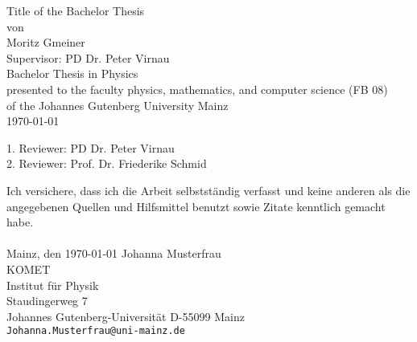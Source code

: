 \documentclass[a4paper,11pt,oneside,final,english,toc=bib]{scrbook}
\begin{document}

\begin{titlepage}
  \vspace*{6mm}
  \begin{center}
     {\afont Title of the Bachelor Thesis}
     \\[3.5cm]
     {\large von}
     \\[3.5cm]
     {\dfont Moritz Gmeiner}
     \\[1.5cm]
     {\dfont Supervisor: PD Dr. Peter Virnau}
     \\[2cm]
     {\large Bachelor Thesis in Physics \/\\
        presented to the faculty physics, mathematics, and computer science (FB 08) \/\\
        of the Johannes Gutenberg University Mainz \/\\
        \today}
   \end{center}
   \vfill
   1. Reviewer: PD Dr. Peter Virnau \\	
   2. Reviewer: Prof. Dr. Friederike Schmid \\
   \vfill
\end{titlepage}

\thispagestyle{empty}
Ich versichere, dass ich die Arbeit selbstständig verfasst und keine 
anderen als die angegebenen Quellen und Hilfsmittel benutzt sowie 
Zitate kenntlich gemacht habe.
\\
\\[3.5cm] 
Mainz, den \today
\vfill
\noindent 
Johanna Musterfrau\\
KOMET\\
Institut für Physik\\
Staudingerweg 7\\
Johannes Gutenberg-Universität
D-55099 Mainz\\
{ \texttt{Johanna.Musterfrau@uni-mainz.de} }

\end{document}
